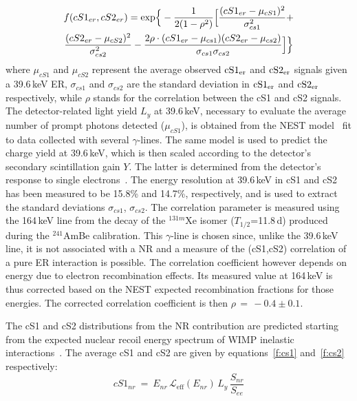 \begin{multline}
	f(cS1_{er},cS2_{er})  = {\rm exp} \Big\{ -\frac{1}{2(1-\rho^2)} \Big[ \frac{(cS1_{er} - \mu_{cS1})^2}{\sigma_{cs1}^2} + \\ 
	 \frac{(cS2_{er} - \mu_{cS2})^2}{\sigma_{cs2}^2} - \frac{2\rho\cdot(cS1_{er} - \mu_{cs1}) (cS2_{er} - \mu_{cs2})} {\sigma_{cs1}\sigma_{cs2}} \Big] \Big\}
\label{f:2dgaus}
\end{multline}
where $\mu_{cS1}$ and $\mu_{cS2}$ 
represent the average observed $\rm{cS1_{er}}$ and $\rm{cS2_{er}}$ signals given a 39.6\,keV ER, $\sigma_{cs1}$ and $\sigma_{cs2}$ are the standard deviation in $\rm{cS1_{er}}$ and $\rm{cS2_{er}}$ respectively,
while $\rho$ stands for the correlation between the cS1 and cS2 signals. The detector-related light yield $L_y$  at 39.6\,keV, necessary to evaluate the average number of prompt photons detected 
($\mu_{cS1}$), is obtained from the NEST model~\cite{NEST,Geant1,Geant2} fit to data collected with several $\gamma$-lines.
The same model is used to predict the charge yield at 39.6\,keV, which is then scaled according to the detector's secondary scintillation gain $Y$. 
 The latter is determined from the detector's response to single electrons~\cite{SingleE}.
The energy resolution at 39.6\,keV in cS1 and cS2 has been measured to be 15.8\% and 14.7\%, respectively, and is used to extract the standard 
deviations $\sigma_{cs1}$, $\sigma_{cs2}$.  The correlation parameter is measured
using the 164\,keV line from the decay of the $^{131m}$Xe isomer ($T_{1/2}$=11.8\,d) produced during the  $^{241}$AmBe calibration. This $\gamma$-line is chosen since, unlike the 39.6\,keV line, 
it is not associated with a NR and a measure of the (cS1,cS2) correlation of a pure ER interaction is possible. The correlation coefficient however depends on energy due to 
electron recombination effects. Its measured value at 164\,keV is thus corrected based on the NEST expected recombination fractions for those energies. 
The corrected correlation coefficient is then $\rho \, = \, -0.4 \pm 0.1$. 


The cS1 and cS2 distributions from the NR contribution are predicted starting from the expected nuclear recoil energy spectrum
of WIMP inelastic interactions~\cite{Baudis:2013bba}. The average cS1 and cS2 are given by equations~\ref{f:cs1} and~\ref{f:cs2} respectively:
\begin{equation}
cS1_{nr} ~=~ E_{nr} \, \mathcal{L}_{\text{eff}}(E_{nr}) \, L_{y} \, \frac{S_{nr}}{S_{ee}}
\label{f:cs1}
\end{equation}

